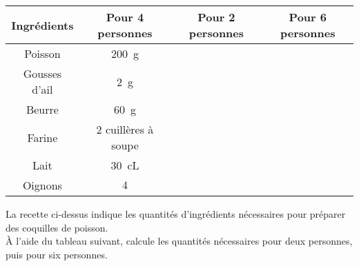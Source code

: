 \begin{center}
\begin{tabular}{|c|c|c|c|}
   \hline Ingrédients & Pour 4 personnes & Pour 2 personnes & Pour 6 personnes \\ 
   \hline Poisson & $200$~g & & \\
   \hline Gousses d'ail & $2$~g & & \\
   \hline Beurre & $60$~g & &  \\
   \hline Farine & $2$ cuillères à soupe & & \\
   \hline Lait & $30$~cL & & \\
   \hline Oignons & $4$ & & \\ 
   \hline
\end{tabular}
\end{center}
La recette ci-dessus indique les quantités d'ingrédients nécessaires pour préparer des coquilles de poisson.
\\\`A l'aide du tableau suivant, calcule les quantités nécessaires pour deux personnes, puis pour six personnes.